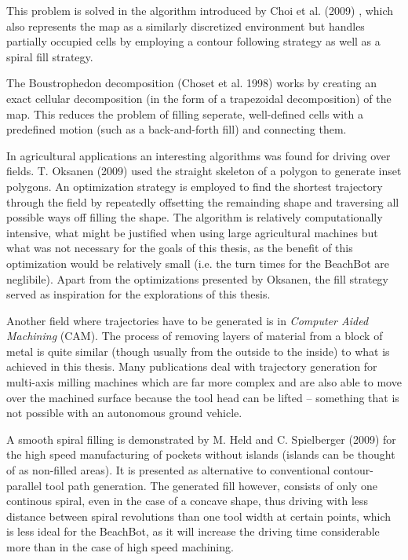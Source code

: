 This problem is solved in the algorithm introduced by Choi et al. (2009) \cite{choi2009online}, which also represents the map as a similarly discretized environment but handles partially occupied cells by employing a contour following strategy as well as a spiral fill strategy.

The Boustrophedon decomposition (Choset et al. 1998) \cite{choset1998coverage} works by creating an exact cellular decomposition (in the form of a trapezoidal decomposition) of the map. This reduces the problem of filling seperate, well-defined cells with a predefined motion (such as a back-and-forth fill) and connecting them.

In agricultural applications an interesting algorithms  was found for driving over fields. T. Oksanen (2009) \citep{ROB:ROB20300} used the straight skeleton of a polygon to generate inset polygons. An optimization strategy is employed to find the shortest trajectory through the field by repeatedly offsetting the remainding shape and traversing all possible ways off filling the shape. The algorithm is relatively computationally intensive, what might be justified when using large agricultural machines but what was not necessary for the goals of this thesis, as the benefit of this optimization would be relatively small (i.e. the turn times for the BeachBot are neglibile). Apart from the optimizations presented by Oksanen, the fill strategy served as inspiration for the explorations of this thesis.

Another field where trajectories have to be generated is in \textit{Computer Aided Machining} (CAM). The process of removing layers of material from a block of metal is quite similar (though usually from the outside to the inside) to what is achieved in this thesis. Many publications deal with trajectory generation for multi-axis milling machines which are far more complex and are also able to move over the machined surface because the tool head can be lifted -- something that is not possible with an autonomous ground vehicle.

A smooth spiral filling is demonstrated by M. Held and C. Spielberger (2009) \cite{held2009smooth} for the high speed manufacturing of pockets without islands (islands can be thought of as non-filled areas). It is presented as alternative to conventional contour-parallel tool path generation. The generated fill however, consists of only one continous spiral, even in the case of a concave shape, thus driving with less distance between spiral revolutions than one tool width at certain points, which is less ideal for the BeachBot, as it will increase the driving time considerable more than in the case of high speed machining.

